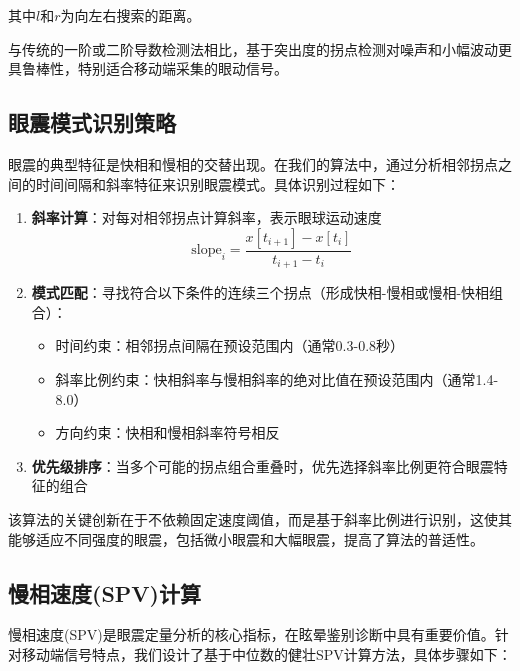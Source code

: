 其中$l$和$r$为向左右搜索的距离。

与传统的一阶或二阶导数检测法相比，基于突出度的拐点检测对噪声和小幅波动更具鲁棒性，特别适合移动端采集的眼动信号。

\subsection{眼震模式识别策略}

眼震的典型特征是快相和慢相的交替出现。在我们的算法中，通过分析相邻拐点之间的时间间隔和斜率特征来识别眼震模式。具体识别过程如下：

\begin{enumerate}
  \item \textbf{斜率计算}：对每对相邻拐点计算斜率，表示眼球运动速度
   \begin{equation}
   \text{slope}_{i} = \frac{x[t_{i+1}] - x[t_i]}{t_{i+1} - t_i}
   \end{equation}

  \item \textbf{模式匹配}：寻找符合以下条件的连续三个拐点（形成快相-慢相或慢相-快相组合）：
   \begin{itemize}
     \item 时间约束：相邻拐点间隔在预设范围内（通常0.3-0.8秒）
     \item 斜率比例约束：快相斜率与慢相斜率的绝对比值在预设范围内（通常1.4-8.0）
     \item 方向约束：快相和慢相斜率符号相反
   \end{itemize}

  \item \textbf{优先级排序}：当多个可能的拐点组合重叠时，优先选择斜率比例更符合眼震特征的组合
\end{enumerate}

该算法的关键创新在于不依赖固定速度阈值，而是基于斜率比例进行识别，这使其能够适应不同强度的眼震，包括微小眼震和大幅眼震，提高了算法的普适性。

\subsection{慢相速度(SPV)计算}

慢相速度(SPV)是眼震定量分析的核心指标，在眩晕鉴别诊断中具有重要价值。针对移动端信号特点，我们设计了基于中位数的健壮SPV计算方法，具体步骤如下：


